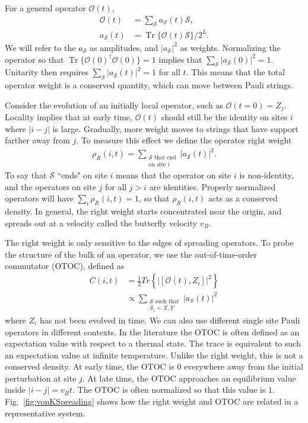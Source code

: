 \documentclass[a4paper,12pt]{article}
\renewcommand{\cal}{\mathcal}
\newcommand{\half}{\frac{1}{2}}
\newcommand{\abs}[1]{\left| #1 \right|}
\renewcommand{\S}{\mathcal{S}}
\newcommand{\nn}{\nonumber\\}
\DeclareMathOperator{\Tr}{Tr}
\begin{document}
For a general operator $\cal{O}(t)$,
\begin{align}
\cal{O}(t) &= \sum_\S a_\S(t) \S,\nn
a_\S(t) &= \Tr\{\cal{O}(t) \S \}/2^L.
\end{align}
We will refer to the $a_\S$ as amplitudes, and $\abs{a_\S}^2$ as weights. Normalizing the operator so that $\Tr\{\cal{O}(0)^\dag\cal{O}(0) \}=1$ implies that $\sum_\S \abs{a_\S(0)}^2=1$. Unitarity then requires $\sum_\S \abs{a_\S(t)}^2=1$ for all $t$. This means that the total operator weight is a conserved quantity, which can move between Pauli strings.

Consider the evolution of an initially local operator, such as $\cal{O}(t=0)=Z_{j}$. Locality implies that at early time, $\cal{O}(t)$ should still be the identity on sites $i$ where $\abs{i-j}$ is large. Gradually, more weight moves to strings that have support farther away from $j$. To measure this effect we define the operator right weight
\begin{align}
\rho_R(i,t) = \sum_{\substack{\text{$\S$ that end}\\\text{on site $i$}}}\abs{a_\S(t)}^2.
\end{align}
To say that $\S$ ``ends" on site $i$ means that the operator on site $i$ is non-identity, and the operators on site $j$ for all $j>i$ are identities.
Properly normalized operators will have $\sum_i\rho_R(i,t)=1$, so that $\rho_R(i,t)$ acts as a conserved density. In general, the right weight starts concentrated near the origin, and spreads out at a velocity called the butterfly velocity $v_B$. 

The right weight is only sensitive to the edges of spreading operators. To probe the structure of the bulk of an operator, we use the out-of-time-order commutator (OTOC), defined as
\begin{align}
C(i,t) &= \half Tr\left\{\abs{[\cal{O}(t), Z_i]}^2\right\}\nn
&\propto \sum_{\substack{\text{$\S$ such that}\\\text{$\S_i = X, Y$}}} \abs{a_\S(t)}^2
\end{align}
where $Z_i$ has not been evolved in time. We can also use different single site Pauli operators in different contexts. 
In the literature the OTOC is often defined as an expectation value with respect to a thermal state. The trace is equivalent to such an expectation value at infinite temperature.
Unlike the right weight, this is not a conserved density. At early time, the OTOC is 0 everywhere away from the initial perturbation at site $j$. At late time, the OTOC approaches an equilibrium value inside $\abs{i-j} = v_B t$. The OTOC is often normalized so that this value is $1$. Fig.~\ref{fig:vonKSpreading} shows how the right weight and OTOC are related in a representative system.
\end{document}
